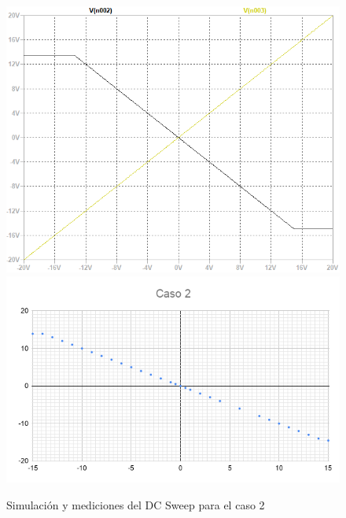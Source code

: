 \begin{figure}[H]
\begin{centering}
\includegraphics[scale=0.4]{../Ex1/iA/Resources1a/dcswp2sim}\includegraphics[scale=0.4]{../Ex1/iA/Resources1a/DCSWEEP2MED}
\par\end{centering}
\caption{Simulación y mediciones del DC Sweep para el caso 2}
\label{1_a_40}

\end{figure}

